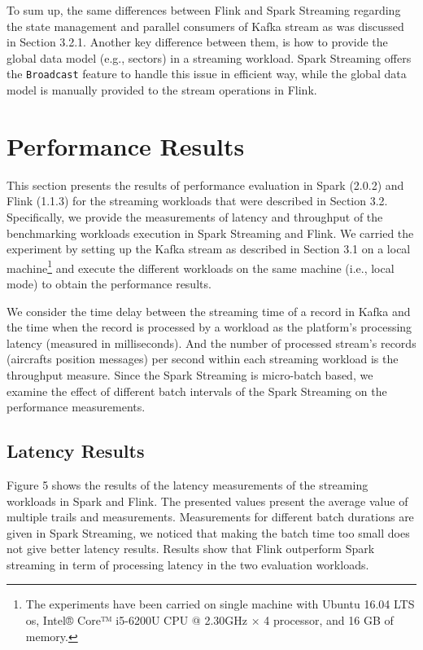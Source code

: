 \documentclass[]{article}
\begin{document}
\begin{itemize}
 \end{itemize}
 
 
 \par To sum up, the same differences between Flink and Spark Streaming regarding the state management and parallel  consumers of Kafka stream as was discussed in Section 3.2.1. Another key difference between them, is how  to provide the global data model (e.g., sectors) in a streaming workload. Spark Streaming offers the \texttt{Broadcast} feature to handle this issue in efficient way, while the global data model is manually provided  to the stream operations in Flink.
\section{Performance Results}

\par This section presents the results of performance evaluation in Spark (2.0.2) and Flink (1.1.3) for the streaming workloads that were described in Section 3.2. Specifically, we provide  the measurements of latency and throughput of the benchmarking workloads execution in Spark Streaming and Flink. We carried the experiment by setting up the Kafka stream as described in Section 3.1 on a local machine\footnote{ The experiments have been carried  on single machine with Ubuntu 16.04 LTS os, Intel® Core™ i5-6200U CPU @ 2.30GHz × 4  processor, and 16 GB of memory.} and execute the different workloads on the same machine (i.e., local mode) to obtain the performance results.  

\par We consider the time delay between the streaming time of a record in Kafka and  the time when the record is processed by a workload as the platform's processing latency (measured in milliseconds). And the number of processed stream's records (aircrafts position messages) per second within each streaming workload is the throughput measure. Since the Spark Streaming is micro-batch based,  we examine the effect of different batch intervals
of the Spark Streaming on the performance measurements.


\subsection{Latency Results}

Figure 5 shows the results of the latency measurements of the streaming workloads in Spark and Flink. The presented values present the average value of multiple trails and measurements. Measurements for different batch durations are given in Spark Streaming, we noticed that making the batch time too small does not give better latency results. Results show that Flink outperform Spark streaming in term of processing latency in the two evaluation workloads.
\end{document}
